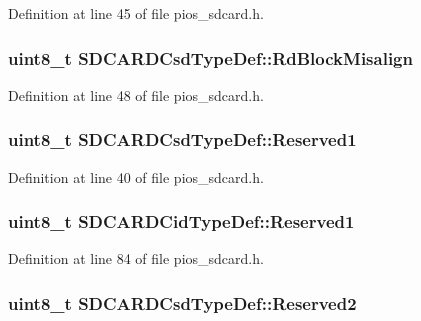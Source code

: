 \-Definition at line 45 of file pios\-\_\-sdcard.\-h.

\hypertarget{group___p_i_o_s___s_d_c_a_r_d_ga959156fe53645cd48d715f89c3407618}{
\subsubsection[{\-Rd\-Block\-Misalign}]{\setlength{\rightskip}{0pt plus 5cm}uint8\-\_\-t {\bf \-S\-D\-C\-A\-R\-D\-Csd\-Type\-Def\-::\-Rd\-Block\-Misalign}}}\label{group___p_i_o_s___s_d_c_a_r_d_ga959156fe53645cd48d715f89c3407618}


\-Definition at line 48 of file pios\-\_\-sdcard.\-h.

\hypertarget{group___p_i_o_s___s_d_c_a_r_d_ga8d15c8c3b9e293b1b62efea47010180d}{
\subsubsection[{\-Reserved1}]{\setlength{\rightskip}{0pt plus 5cm}uint8\-\_\-t {\bf \-S\-D\-C\-A\-R\-D\-Csd\-Type\-Def\-::\-Reserved1}}}\label{group___p_i_o_s___s_d_c_a_r_d_ga8d15c8c3b9e293b1b62efea47010180d}


\-Definition at line 40 of file pios\-\_\-sdcard.\-h.

\hypertarget{group___p_i_o_s___s_d_c_a_r_d_gaa6d5ceee00ac588d04a7d1e913746732}{
\subsubsection[{\-Reserved1}]{\setlength{\rightskip}{0pt plus 5cm}uint8\-\_\-t {\bf \-S\-D\-C\-A\-R\-D\-Cid\-Type\-Def\-::\-Reserved1}}}\label{group___p_i_o_s___s_d_c_a_r_d_gaa6d5ceee00ac588d04a7d1e913746732}


\-Definition at line 84 of file pios\-\_\-sdcard.\-h.

\hypertarget{group___p_i_o_s___s_d_c_a_r_d_ga2580f84971aaa12e06b546fd8b884dad}{
\subsubsection[{\-Reserved2}]{\setlength{\rightskip}{0pt plus 5cm}uint8\-\_\-t {\bf \-S\-D\-C\-A\-R\-D\-Csd\-Type\-Def\-::\-Reserved2}}}\label{group___p_i_o_s___s_d_c_a_r_d_ga2580f84971aaa12e06b546fd8b884dad}


